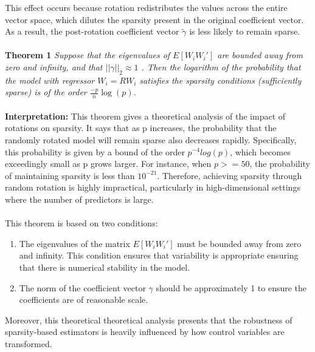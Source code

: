 This effect occurs because rotation redistributes the values across the entire vector space, which dilutes the sparsity present in the original coefficient vector. As a result, the post-rotation coefficient vector $\tilde{\gamma}$ is less likely to remain sparse. \\
\\
\textbf{Theorem 1}
\textit{Suppose that the eigenvalues of  $E[W_i W_i\prime]$  are bounded away from zero and infinity, and that  $||\gamma||_2 \approx 1$ . Then the logarithm of the probability that the model with regressor $W_i = RW_i$   satisfies the sparsity conditions (sufficiently sparse) is of the order $\frac{-p}{n} \log (p)$.}
\\
\\
\textbf{Interpretation:} This theorem gives a theoretical analysis of the impact of rotations on sparsity. It says that as p increases, the probability that the randomly rotated model will remain sparse also decreases rapidly. Specifically, this probability is given by a bound of the order $p^{-4}log(p)$, which becomes exceedingly small as p grows larger. For instance, when $p>= 50$, the probability of maintaining sparsity is less than $10^{-21}$. Therefore, achieving sparsity through random rotation is highly impractical, particularly in high-dimensional settings where the number of predictors is large. \\
\\
This theorem is based on two conditions:
\begin{enumerate}
    \item The eigenvalues of the matrix $E[W_i W_i\prime]$ must be bounded away from zero and infinity. This condition ensures that variability is appropriate ensuring that there is numerical stability in the model.
    \item The norm of the coefficient vector $\gamma$ should be approximately 1 to ensure the coefficients are of reasonable scale. 
\end{enumerate}

Moreover, this theoretical theoretical analysis presents that the robustness of sparsity-based estimators is heavily influenced by how control variables are transformed. 